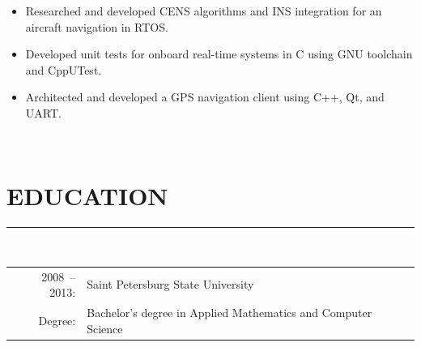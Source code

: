 \documentclass[a4paper,oneside,12pt]{article}
\newcommand{\cvpart}[1]{%
\vspace{-1em}%
\section*{\large\bfseries\MakeTextUppercase{#1}}%
\vspace{-1em}%
\rule{\linewidth}{0.3em}\\[-.3em]%
}
\begin{document}
\begin{itemize}
    \setlength{\itemsep}{-2pt}
    \item Researched and developed CENS algorithms and INS integration for an aircraft navigation in RTOS.
    \item Developed unit tests for onboard real-time systems in C using GNU toolchain and CppUTest.
    \item Architected and developed a GPS navigation client using C++, Qt, and UART.
\end{itemize}

~\\

\cvpart{Education}

\begin{tabularx}{\textwidth}{rX}
  2008~-- 2013:& Saint Petersburg State University\\
        Degree:& Bachelor's degree in Applied Mathematics and Computer Science\\ 
\end{tabularx}

~\\
\end{document}
